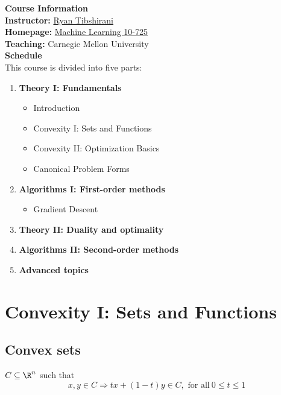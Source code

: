\documentclass[a4paper]{article}
\def\nlecturer {Ryan Tibshirani}
\begin{document}
\maketitle
{\small
\noindent\textbf{Course Information}\\ 
\indent \textbf{Instructor:} \textcolor{blue}{\href{https://www.stat.berkeley.edu/~ryantibs/index.html}{\nlecturer}} \\
\indent\textbf{Homepage:} \textcolor{blue}{\href{https://www.stat.cmu.edu/~ryantibs/convexopt/}{Machine Learning 10-725}} \\
\indent\textbf{Teaching:} Carnegie Mellon University \\

\vspace{10pt}
\noindent\textbf{Schedule}\\
\indent This course is divided into five parts: 
\begin{enumerate}
    \item \textbf{Theory I: Fundamentals}
    \begin{itemize}
        \item Introduction
        \item Convexity I: Sets and Functions
        \item Convexity II: Optimization Basics
        \item Canonical Problem Forms
    \end{itemize}
    \item \textbf{Algorithms I: First-order methods}
    \begin{itemize}
      \item Gradient Descent
    \end{itemize}
    \item \textbf{Theory II: Duality and optimality}
    \item \textbf{Algorithms II: Second-order methods}
    \item \textbf{Advanced topics}
\end{enumerate}

\tableofcontents


\section{Convexity I: Sets and Functions}
\subsection{Convex sets}
\begin{defi}
  $C \subseteq \R^n$ such that 
  \[
      x, y \in C \Longrightarrow  tx + (1-t)y \in C,\text{\ for\ all}\ 0 \leq t \leq 1 
  \]
\end{defi}

}
\end{document}
